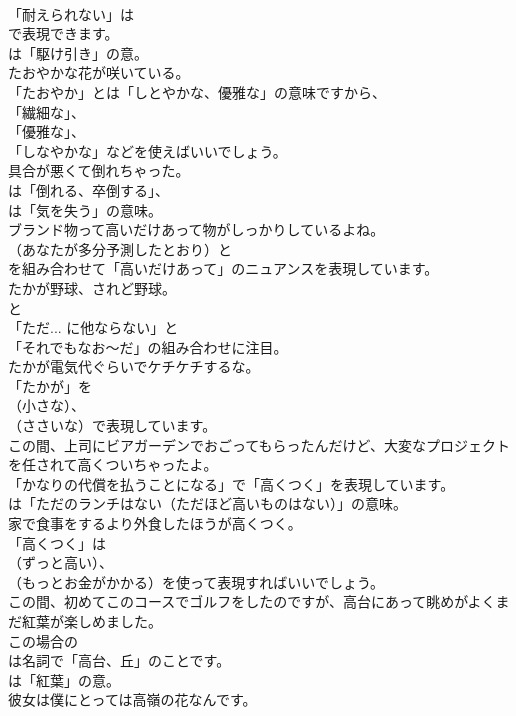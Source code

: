 \documentclass[8pt]{extreport}
\begin{document}
\begin{CJK}{UTF8}{min}
\\	「耐えられない」は 
\\	で表現できます。
\\	は「駆け引き」の意。	
\\	たおやかな花が咲いている。 
\\	「たおやか」とは「しとやかな、優雅な」の意味ですから、
\\	「繊細な」、
\\	「優雅な」、
\\	「しなやかな」などを使えばいいでしょう。	
\\	具合が悪くて倒れちゃった。 
\\	は「倒れる、卒倒する」、
\\	は「気を失う」の意味。	
\\	ブランド物って高いだけあって物がしっかりしているよね。 
\\	（あなたが多分予測したとおり）と 
\\	を組み合わせて「高いだけあって」のニュアンスを表現しています。	
\\	たかが野球、されど野球。 
\\	と
\\	「ただ... に他ならない」と
\\	「それでもなお～だ」の組み合わせに注目。	
\\	たかが電気代ぐらいでケチケチするな。 
\\	「たかが」を 
\\	（小さな）、
\\	（ささいな）で表現しています。	
\\	この間、上司にビアガーデンでおごってもらったんだけど、大変なプロジェクトを任されて高くついちゃったよ。 
\\	「かなりの代償を払うことになる」で「高くつく」を表現しています。
\\	は「ただのランチはない（ただほど高いものはない）」の意味。	
\\	家で食事をするより外食したほうが高くつく。 
\\	「高くつく」は 
\\	（ずっと高い）、
\\	（もっとお金がかかる）を使って表現すればいいでしょう。	
\\	この間、初めてこのコースでゴルフをしたのですが、高台にあって眺めがよくまだ紅葉が楽しめました。 
\\	この場合の 
\\	は名詞で「高台、丘」のことです。
\\	は「紅葉」の意。	
\\	彼女は僕にとっては高嶺の花なんです。 

\end{CJK}
\end{document}
